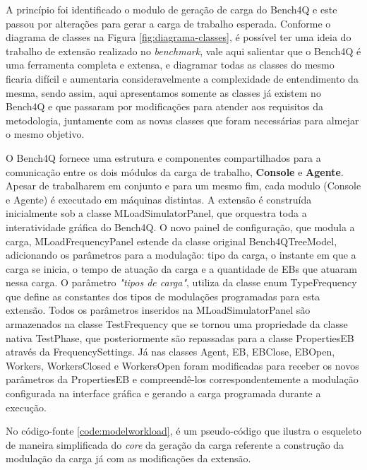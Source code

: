 A princípio foi identificado o modulo de geração de carga do Bench4Q e este passou por alterações para gerar a carga de trabalho esperada. Conforme o diagrama de classes na Figura \ref{fig:diagrama-classes}, é possível ter uma ideia do trabalho de extensão realizado no \textit{benchmark}, vale aqui salientar que o Bench4Q é uma ferramenta completa e extensa, e diagramar todas as classes do mesmo ficaria difícil e aumentaria consideravelmente a complexidade de entendimento da mesma, sendo assim, aqui apresentamos somente as classes já existem no Bench4Q e que passaram por modificações para atender aos requisitos da metodologia, juntamente com as novas classes que foram necessárias para almejar o mesmo objetivo.

O Bench4Q fornece uma estrutura e componentes compartilhados para a comunicação entre os dois módulos da carga de trabalho, \textbf{Console} e \textbf{Agente}. Apesar de trabalharem em conjunto e para um mesmo fim, cada modulo (Console e Agente) é executado em máquinas distintas.  A extensão é construída inicialmente sob a classe \textsf{MLoadSimulatorPanel}, que orquestra toda a interatividade gráfica do Bench4Q. O novo painel de configuração, que modula a carga, \textsf{MLoadFrequencyPanel} estende da classe original \textsf{Bench4QTreeModel}, adicionando os parâmetros para a modulação: tipo da carga, o instante em que a carga se inicia, o tempo de atuação da carga e a quantidade de EBs que atuaram nessa carga. O parâmetro \textit{"tipos de carga"}, utiliza da classe enum \textsf{TypeFrequency} que define as constantes dos tipos de modulações programadas para esta extensão.  Todos os parâmetros inseridos na \textsf{MLoadSimulatorPanel} são armazenados na classe \textsf{TestFrequency} que se tornou uma propriedade da classe nativa \textsf{TestPhase}, que posteriormente são repassadas para a classe \textsf{PropertiesEB} através da \textsf{FrequencySettings}. Já nas classes \textsf{Agent}, \textsf{EB}, \textsf{EBClose}, \textsf{EBOpen}, \textsf{Workers}, \textsf{WorkersClosed} e \textsf{WorkersOpen} foram modificadas para receber os novos parâmetros da \textsf{PropertiesEB} e compreendê-los correspondentemente a modulação configurada na interface gráfica e gerando a carga programada durante a execução.

No código-fonte \ref{code:modelworkload}, é um pseudo-código que ilustra o esqueleto de maneira simplificada do \textit{core} da geração da carga referente a construção da modulação da carga já com as modificações da extensão.

